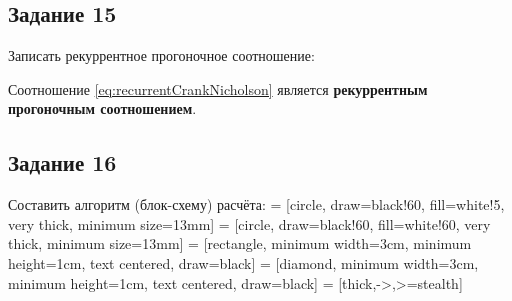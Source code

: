 \documentclass[12pt, a4paper]{report}
\begin{document}
	\subsection*{Задание 15}
	\large
	Записать рекуррентное прогоночное соотношение: \par
	Соотношение \eqref{eq:recurrentCrankNicholson} является \textbf{рекуррентным прогоночным соотношением}.
		
	\subsection*{Задание 16}
	\large
	Составить алгоритм (блок-схему) расчёта:
	 = [circle, draw=black!60, fill=white!5, very thick, minimum size=13mm]
	 = [circle, draw=black!60, fill=white!60, very thick, minimum size=13mm]
	 = [rectangle, minimum width=3cm, minimum height=1cm, text centered, draw=black]
	 = [diamond, minimum width=3cm, minimum height=1cm, text centered, draw=black]
	 = [thick,->,>=stealth]
\end{document}
